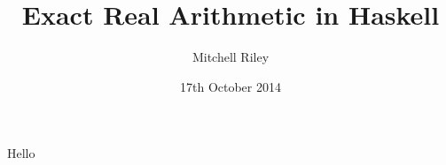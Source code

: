 \documentclass[11pt]{beamer}
\author{Mitchell Riley}
\title{Exact Real Arithmetic in Haskell}
\date{17th October 2014}
\begin{document}
\begin{frame}
\titlepage
\end{frame}

\begin{frame}
Hello
\end{frame}

\begin{frame}
\nocite{*}
\printbibliography
\end{frame}
\end{document}
